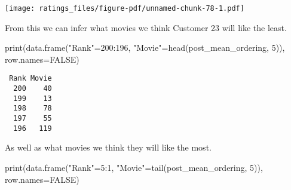 \documentclass[
  letterpaper,
  DIV=11,
  numbers=noendperiod]{scrartcl}
\newenvironment{Shaded}{\begin{snugshade}}{\end{snugshade}}
\newcommand{\AttributeTok}[1]{\textcolor[rgb]{0.40,0.45,0.13}{#1}}
\newcommand{\ConstantTok}[1]{\textcolor[rgb]{0.56,0.35,0.01}{#1}}
\newcommand{\ControlFlowTok}[1]{\textcolor[rgb]{0.00,0.23,0.31}{#1}}
\newcommand{\DecValTok}[1]{\textcolor[rgb]{0.68,0.00,0.00}{#1}}
\newcommand{\FunctionTok}[1]{\textcolor[rgb]{0.28,0.35,0.67}{#1}}
\newcommand{\NormalTok}[1]{\textcolor[rgb]{0.00,0.23,0.31}{#1}}
\newcommand{\OtherTok}[1]{\textcolor[rgb]{0.00,0.23,0.31}{#1}}
\newcommand{\SpecialCharTok}[1]{\textcolor[rgb]{0.37,0.37,0.37}{#1}}
\newcommand{\StringTok}[1]{\textcolor[rgb]{0.13,0.47,0.30}{#1}}
\begin{document}
\begin{Shaded}
\end{Shaded}

\texttt{[image: ratings\_files/figure-pdf/unnamed-chunk-78-1.pdf]}

From this we can infer what movies we think Customer 23 will like the
least.

\begin{Shaded}
\begin{Highlighting}[]
\FunctionTok{print}\NormalTok{(}\FunctionTok{data.frame}\NormalTok{(}\StringTok{"Rank"}\OtherTok{=}\DecValTok{200}\SpecialCharTok{:}\DecValTok{196}\NormalTok{,}
                 \StringTok{"Movie"}\OtherTok{=}\FunctionTok{head}\NormalTok{(post\_mean\_ordering, }\DecValTok{5}\NormalTok{)),}
      \AttributeTok{row.names=}\ConstantTok{FALSE}\NormalTok{)}
\end{Highlighting}
\end{Shaded}

\begin{verbatim}
 Rank Movie
  200    40
  199    13
  198    78
  197    55
  196   119
\end{verbatim}

As well as what movies we think they will like the most.

\begin{Shaded}
\begin{Highlighting}[]
\FunctionTok{print}\NormalTok{(}\FunctionTok{data.frame}\NormalTok{(}\StringTok{"Rank"}\OtherTok{=}\DecValTok{5}\SpecialCharTok{:}\DecValTok{1}\NormalTok{,}
                 \StringTok{"Movie"}\OtherTok{=}\FunctionTok{tail}\NormalTok{(post\_mean\_ordering, }\DecValTok{5}\NormalTok{)),}
      \AttributeTok{row.names=}\ConstantTok{FALSE}\NormalTok{)}
\end{Highlighting}
\end{Shaded}
\end{document}
